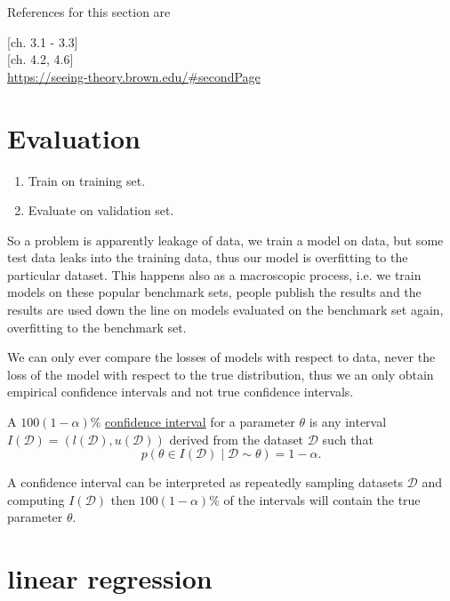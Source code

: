 \documentclass[12 pt]{article}        	%
\begin{document}
References for this section are 
\begin{center}
    \cite{ML_aPP}[ch. 3.1 - 3.3]
    \\
    \cite{pml1Book}[ch. 4.2, 4.6]
    \\
    \url{https://seeing-theory.brown.edu/#secondPage}
\end{center}

\section{Evaluation}
\begin{enumerate}
    \item 
    Train on training set.

    \item 
    Evaluate on validation set.
\end{enumerate}

So a problem is apparently leakage of data, we train a model on data, but some test data leaks into the training data, thus our model is overfitting to the particular dataset.
This happens also as a macroscopic process, i.e. we train models on these popular benchmark sets, people publish the results and the results are used down the line on models evaluated on the benchmark set again, overfitting to the benchmark set.


We can only ever compare the losses of models with respect to data, never the loss of the model with respect to the true distribution, thus we an only obtain empirical confidence intervals and not true confidence intervals.

\begin{defi}
    A $ 100 ( 1 - \alpha ) \% $ \underline{confidence interval} for a parameter $ \theta $ is any interval $ I ( \mathcal{ D } ) = ( l ( \mathcal{ D } ) , u ( \mathcal{ D } ) ) $ derived from the dataset $ \mathcal{ D } $ such that 
    \[
        p ( \theta \in I ( \mathcal{ D } ) \mid \mathcal{ D } \sim \theta ) 
        =
        1 - \alpha. 
    \]
\end{defi}

A confidence interval can be interpreted as repeatedly sampling datasets $ \mathcal{ D } $ and computing $ I ( \mathcal{ D } ) $ then $ 100 ( 1 - \alpha ) \% $ of the intervals will contain the true parameter $ \theta $. 
\section{linear regression}
\end{document}
